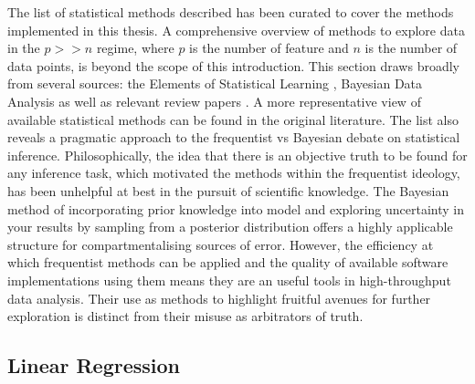 \documentclass[../main.tex]{subfiles}
\begin{document}
The list of statistical methods described has been curated to cover the methods implemented in this thesis.
A comprehensive overview of methods to explore data in the $p >> n$ regime, where $p$ is the number of feature and $n$ is the number of data points, is beyond the scope of this introduction.
This section draws broadly from several sources: the Elements of Statistical Learning \parencite{Hastie2009}, Bayesian Data Analysis \parencite{Gelman2014} as well as relevant review papers \parencite{Greener2021, Wu2015}.
A more representative view of available statistical methods can be found in the original literature.
The list also reveals a pragmatic approach to the frequentist vs Bayesian debate on statistical inference.
Philosophically, the idea that there is an objective truth to be found for any inference task, which motivated the methods within the frequentist ideology, has been unhelpful at best in the pursuit of scientific knowledge.
The Bayesian method of incorporating prior knowledge into model and exploring uncertainty in your results by sampling from a posterior distribution offers a highly applicable structure for compartmentalising sources of error.
However, the efficiency at which frequentist methods can be applied and the quality of available software implementations using them means they are an useful tools in high-throughput data analysis.
Their use as methods to highlight fruitful avenues for further exploration is distinct from their misuse as arbitrators of truth. 

\subsection{Linear Regression}
\end{document}
